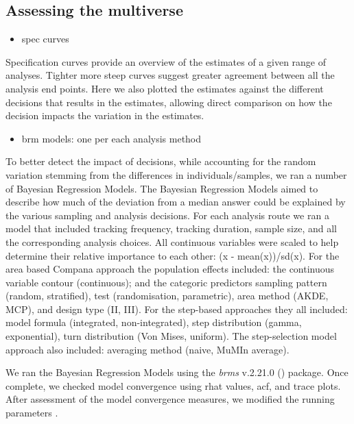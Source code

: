 \documentclass[10pt,a4paper]{article}
\providecommand{\tightlist}{%
  \setlength{\itemsep}{0pt}\setlength{\parskip}{0pt}}
\begin{document}
\subsection{Assessing the multiverse}\label{assessing-the-multiverse}

\begin{itemize}
\tightlist
\item
  spec curves
\end{itemize}

Specification curves provide an overview of the estimates of a given range of analyses.
Tighter more steep curves suggest greater agreement between all the analysis end points.
Here we also plotted the estimates against the different decisions that results in the estimates, allowing direct comparison on how the decision impacts the variation in the estimates.

\begin{itemize}
\tightlist
\item
  brm models: one per each analysis method
\end{itemize}

To better detect the impact of decisions, while accounting for the random variation stemming from the differences in individuals/samples, we ran a number of Bayesian Regression Models.
The Bayesian Regression Models aimed to describe how much of the deviation from a median answer could be explained by the various sampling and analysis decisions.
For each analysis route we ran a model that included tracking frequency, tracking duration, sample size, and all the corresponding analysis choices.
All continuous variables were scaled to help determine their relative importance to each other: (x - mean(x))/sd(x).
For the area based Compana approach the population effects included: the continuous variable contour (continuous); and the categoric predictors sampling pattern (random, stratified), test (randomisation, parametric), area method (AKDE, MCP), and design type (II, III).
For the step-based approaches they all included: model formula (integrated, non-integrated), step distribution (gamma, exponential), turn distribution (Von Mises, uniform).
The step-selection model approach also included: averaging method (naive, MuMIn average).

We ran the Bayesian Regression Models using the \emph{brms} v.2.21.0 () package.
Once complete, we checked model convergence using rhat values, acf, and trace plots.
After assessment of the model convergence measures, we modified the running parameters .
\end{document}
